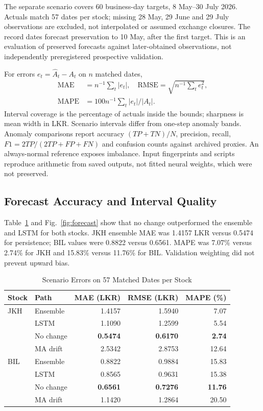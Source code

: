 \documentclass[conference]{IEEEtran}
\begin{document}
The separate scenario covers 60 business-day targets, 8 May--30 July 2026. Actuals match 57 dates per stock; missing 28 May, 29 June and 29 July observations are excluded, not interpolated or assumed exchange closures. The record dates forecast preservation to 10 May, after the first target. This is an evaluation of preserved forecasts against later-obtained observations, not independently preregistered prospective validation.

For errors $e_t=\widehat A_t-A_t$ on $n$ matched dates,
\begin{align}
\mathrm{MAE}&=n^{-1}\sum_t|e_t|,\quad
\mathrm{RMSE}=\sqrt{n^{-1}\sum_te_t^2},\nonumber\\
\mathrm{MAPE}&=100n^{-1}\sum_t|e_t|/|A_t|.
\label{eq:errors}
\end{align}
Interval coverage is the percentage of actuals inside the bounds; sharpness is mean width in LKR. Scenario intervals differ from one-step anomaly bands. Anomaly comparisons report accuracy $(TP+TN)/N$, precision, recall, $F1=2TP/(2TP+FP+FN)$ and confusion counts against archived proxies. An always-normal reference exposes imbalance. Input fingerprints and scripts reproduce arithmetic from saved outputs, not fitted neural weights, which were not preserved.

\subsection{Forecast Accuracy and Interval Quality}
Table~\ref{tab:forecast} and Fig.~\ref{fig:forecast} show that no change outperformed the ensemble and LSTM for both stocks. JKH ensemble MAE was 1.4157 LKR versus 0.5474 for persistence; BIL values were 0.8822 versus 0.6561. MAPE was 7.07\% versus 2.74\% for JKH and 15.83\% versus 11.76\% for BIL. Validation weighting did not prevent upward bias.

\begin{table}[!t]
\caption{Scenario Errors on 57 Matched Dates per Stock}
\label{tab:forecast}
\centering\footnotesize\setlength{\tabcolsep}{3pt}
\begin{tabular}{@{}llrrr@{}}\toprule
Stock & Path & MAE (LKR) & RMSE (LKR) & MAPE (\%)\\\midrule
JKH & Ensemble & 1.4157 & 1.5940 & 7.07\\
& LSTM & 1.1090 & 1.2599 & 5.54\\
& No change & \textbf{0.5474} & \textbf{0.6170} & \textbf{2.74}\\
& MA drift & 2.5342 & 2.8753 & 12.64\\\midrule
BIL & Ensemble & 0.8822 & 0.9884 & 15.83\\
& LSTM & 0.8565 & 0.9631 & 15.38\\
& No change & \textbf{0.6561} & \textbf{0.7276} & \textbf{11.76}\\
& MA drift & 1.1420 & 1.2864 & 20.50\\\bottomrule
\end{tabular}
\end{table}
\end{document}
